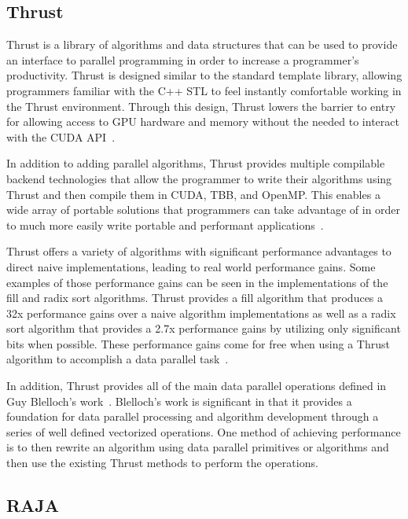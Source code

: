 \subsection*{\textbf{Thrust}}

Thrust is a library of algorithms and data structures that can be used to provide an interface to parallel programming in order to increase a programmer's productivity.
%
Thrust is designed similar to the standard template library, allowing programmers familiar with the C++ STL to feel instantly comfortable working in the Thrust environment.
%
Through this design, Thrust lowers the barrier to entry for allowing access to GPU hardware and memory without the needed to interact with the CUDA API~\cite{hoberock2010thrust}.

In addition to adding parallel algorithms, Thrust provides multiple compilable backend technologies that allow the programmer to write their algorithms using Thrust and then compile them in CUDA, TBB, and OpenMP.
%
This enables a wide array of portable solutions that programmers can take advantage of in order to much more easily write portable and performant applications~\cite{thrust}.

Thrust offers a variety of algorithms with significant performance advantages to direct naive implementations, leading to real world performance gains.
%
Some examples of those performance gains can be seen in the implementations of the fill and radix sort algorithms.
Thrust provides a fill algorithm that produces a 32x performance gains over a naive algorithm implementations as well as a radix sort algorithm that provides a 2.7x performance gains by utilizing only significant bits when possible.
%
These performance gains come for free when using a Thrust algorithm to accomplish a data parallel task~\cite{bell2011thrust}.

In addition, Thrust provides all of the main data parallel operations defined in Guy Blelloch's work~\cite{blelloch1990vector}.
%
Blelloch's work is significant in that it provides a foundation for data parallel processing and algorithm development through a series of well defined vectorized operations.
%
One method of achieving performance is to then rewrite an algorithm using data parallel primitives or algorithms and then use the existing Thrust methods to perform the operations.

\subsection*{\textbf{RAJA}}


